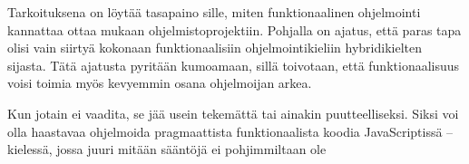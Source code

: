 Tarkoituksena on löytää tasapaino sille, miten funktionaalinen ohjelmointi kannattaa ottaa mukaan ohjelmistoprojektiin. Pohjalla on ajatus, että paras tapa olisi vain siirtyä kokonaan funktionaalisiin ohjelmointikieliin hybridikielten sijasta. Tätä ajatusta pyritään kumoamaan, sillä toivotaan, että funktionaalisuus voisi toimia myös kevyemmin osana ohjelmoijan arkea.

Kun jotain ei vaadita, se jää usein tekemättä tai ainakin puutteelliseksi. Siksi voi olla haastavaa ohjelmoida pragmaattista funktionaalista koodia JavaScriptissä – kielessä, jossa juuri mitään sääntöjä ei pohjimmiltaan ole
